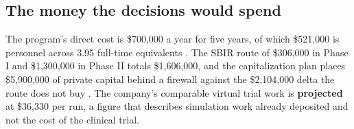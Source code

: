 \subsection{The money the decisions would spend}

The program's direct cost is \$700,000 a year for five years, of which \$521,000
is personnel across 3.95 full-time equivalents \cite{movein2026}. The SBIR route
of \$306,000 in Phase I and \$1,300,000 in Phase II totals \$1,606,000, and the
capitalization plan places \$5,900,000 of private capital behind a firewall
against the \$2,104,000 delta the route does not buy \cite{capitalplan2026}. The
company's comparable virtual trial work is \textbf{projected} at \$36,330 per
run, a figure that describes simulation work already deposited and not the cost
of the clinical trial.
